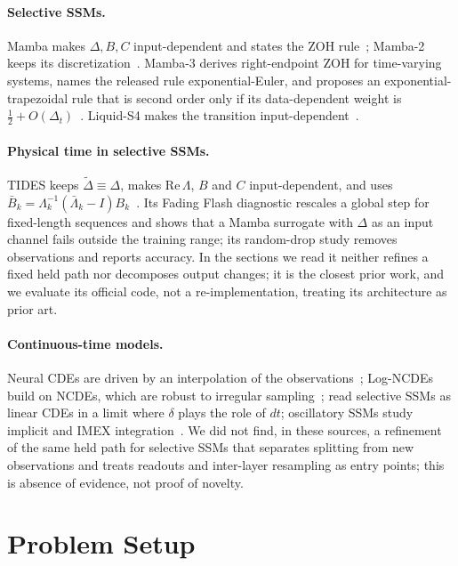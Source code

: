 \documentclass{article}
\theoremstyle{plain}
\theoremstyle{definition}
\theoremstyle{remark}
\begin{document}
\paragraph{Selective SSMs.}
Mamba makes $\Delta,B,C$ input-dependent and states the ZOH rule~\citep{gu2023mamba}; Mamba-2 keeps its discretization~\citep{dao2024mamba2}.
Mamba-3 derives right-endpoint ZOH for time-varying systems, names the released rule exponential-Euler, and proposes an exponential-trapezoidal rule that is second order only if its data-dependent weight is $\tfrac12+O(\Delta_t)$~\citep{lahoti2026mamba3}.
Liquid-S4 makes the transition input-dependent~\citep{hasani2022liquid}.

\paragraph{Physical time in selective SSMs.}
TIDES keeps $\tilde\Delta\equiv\Delta$, makes $\mathrm{Re}\,\Lambda$, $B$ and $C$ input-dependent, and uses $\bar B_k=\Lambda_k^{-1}(\bar\Lambda_k-I)B_k$~\citep{soydan2026tides}.
Its Fading Flash diagnostic rescales a global step for fixed-length sequences and shows that a Mamba surrogate with $\Delta$ as an input channel fails outside the training range; its random-drop study removes observations and reports accuracy.
In the sections we read it neither refines a fixed held path nor decomposes output changes; it is the closest prior work, and we evaluate its official code, not a re-implementation, treating its architecture as prior art.

\paragraph{Continuous-time models.}
Neural CDEs are driven by an interpolation of the observations~\citep{kidger2020ncde}; Log-NCDEs build on NCDEs, which are robust to irregular sampling~\citep{walker2024logncde}; \citet{cirone2024theoretical} read selective SSMs as linear CDEs in a limit where $\delta$ plays the role of $dt$; oscillatory SSMs study implicit and IMEX integration~\citep{rusch2024linoss}.
We did not find, in these sources, a refinement of the same held path for selective SSMs that separates splitting from new observations and treats readouts and inter-layer resampling as entry points; this is absence of evidence, not proof of novelty.

\section{Problem Setup}
\label{sec:setup}
\end{document}
